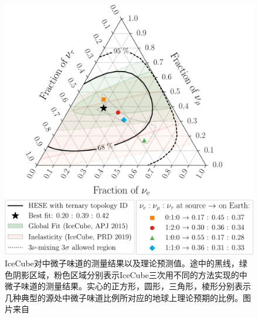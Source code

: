 \begin{figure}[htbp]
    \centering
    \includegraphics[width=0.9\linewidth]{img/IceCube_flavor_ratio_measurement.pdf}
    \caption{IceCube对中微子味道的测量结果以及理论预测值。途中的黑线\cite{IceCube_tau:2020}，绿色阴影区域\cite{IceCube_flux_flavor:2015}，粉色区域\cite{IceCube_inelestic_flavor:2018}分别表示IceCube三次用不同的方法实现的中微子味道的测量结果。实心的正方形，圆形，三角形，棱形分别表示几种典型的源处中微子味道比例所对应的地球上理论预期的比例。图片来自\parencite{IceCube_tau:2020}}
    \label{fig:IceCube_flavor_ratio_measurement}
\end{figure}
